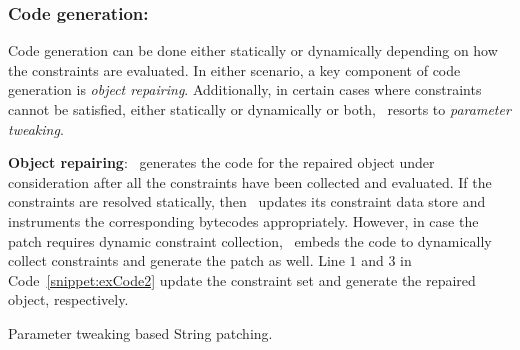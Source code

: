 \subsubsection{Code generation: }
\label{sec:tool:stage2:generation}

Code generation can be done either statically or dynamically depending on how
the constraints are evaluated. In either scenario, a key component of code
generation is \textit{object repairing}. Additionally, in certain cases
where constraints cannot be satisfied, either statically or dynamically or
both, \tool\ resorts to \textit{parameter tweaking}.

\begin{mylist}

 \item \textbf{Object repairing}: \tool\ generates the code for the repaired
object under consideration after all the constraints have been collected and
evaluated. If the constraints are resolved statically, then \tool\ updates its
constraint data store and instruments the corresponding bytecodes appropriately.
However, in case the patch requires dynamic constraint collection, \tool\ embeds
the code to dynamically collect constraints and generate the patch as well. Line
$1$ and $3$ in Code~\ref{snippet:exCode2} update the constraint set and generate
the repaired object, respectively.

\begin{algorithm}[t]
\scriptsize
\DontPrintSemicolon
{}
\caption{Parameter tweaking based String patching.}
\label{algo:stringPatchParametr}
\end{algorithm}


\end{mylist}

